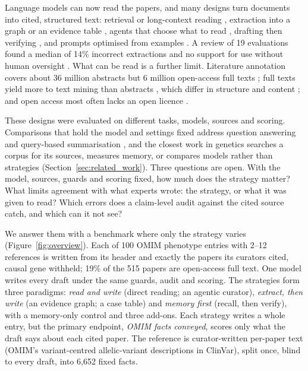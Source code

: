 \documentclass{article} %
\begin{document}
Language models can now read the papers, and many designs turn documents into cited, structured text: retrieval \citep{Lewis2020RetrievalaugmentedGeneration} or long-context reading \citep{li2024retrieval}, extraction into a graph \citep{edge2024local} or an evidence table \citep{joshi2026sliders}, agents that choose what to read \citep{Lla2023PaperqaRetrievalaugmented,skarlinski2024language}, drafting then verifying \citep{dhuliawala2024chainofverification}, and prompts optimised from examples \citep{agrawal2026gepa}. A review of 19 evaluations found a median of 14\% incorrect extractions and no support for use without human oversight \citep{Clark2025GenerativeArtificial}. What can be read is a further limit. Literature annotation covers about 36 million abstracts but 6 million open-access full texts \citep{wei2024pubtator}; full texts yield more to text mining than abstracts \citep{Westergaard2018ComprehensiveQuantitative,Wei2019PubtatorCentral}, which differ in structure and content \citep{Cohen2010StructuralContent}; and open access most often lacks an open licence \citep{Piwowar2018StateOa}.

These designs were evaluated on different tasks, models, sources and scoring. Comparisons that hold the model and settings fixed address question answering and query-based summarisation \citep{li2024retrieval,Li2025LaraBenchmarking,han2025rag}, and the closest work in genetics searches a corpus for its sources, measures memory, or compares models rather than strategies (Section~\ref{sec:related_work}). Three questions are open. With the model, sources, guards and scoring fixed, how much does the strategy matter? What limits agreement with what experts wrote: the strategy, or what it was given to read? Which errors does a claim-level audit against the cited source catch, and which can it not see?

We answer them with a benchmark where only the strategy varies (Figure~\ref{fig:overview}). Each of 100 OMIM phenotype entries with 2--12 references is written from its header and exactly the papers its curators cited, causal gene withheld; 19\% of the 515 papers are open-access full text. One model writes every draft under the same guards, audit and scoring. The strategies form three paradigms: \emph{read and write} (direct reading; an agentic curator), \emph{extract, then write} (an evidence graph; a case table) and \emph{memory first} (recall, then verify), with a memory-only control and three add-ons. Each strategy writes a whole entry, but the primary endpoint, \emph{OMIM facts conveyed}, scores only what the draft says about each cited paper. The reference is curator-written per-paper text (OMIM's variant-centred allelic-variant descriptions in ClinVar), split once, blind to every draft, into 6,652 fixed facts.
\end{document}
